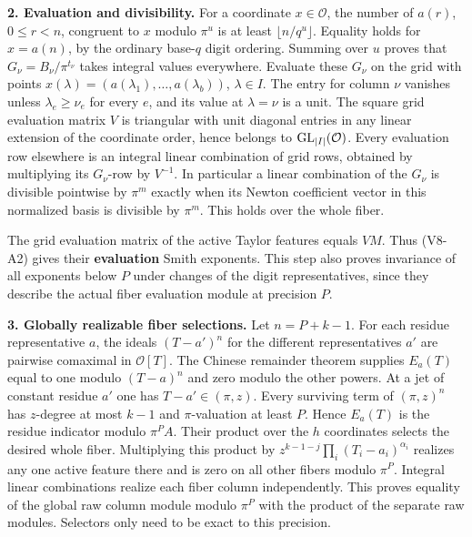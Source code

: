\documentclass[11pt,a4paper]{article}
\begin{document}
\textbf{2. Evaluation and divisibility.} For a coordinate
\(x\in\mathcal O\), the number of \(a(r)\), \(0\le r<n\), congruent to
\(x\) modulo \(\pi^u\) is at least \(\lfloor n/q^u\rfloor\). Equality
holds for \(x=a(n)\), by the ordinary base-\(q\) digit ordering. Summing
over \(u\) proves that \(G_\nu=B_\nu/\pi^{t_\nu}\) takes integral values
everywhere. Evaluate these \(G_\nu\) on the grid with points
\(x(\lambda)=(a(\lambda_1),\ldots,a(\lambda_b))\), \(\lambda\in I\). The
entry for column \(\nu\) vanishes unless \(\lambda_e\ge\nu_e\) for every
\(e\), and its value at \(\lambda=\nu\) is a unit. The square grid
evaluation matrix \(V\) is triangular with unit diagonal entries in any
linear extension of the coordinate order, hence belongs to
\({\rm GL}_{|I|}(\mathcal O)\). Every evaluation row elsewhere is an
integral linear combination of grid rows, obtained by multiplying its
\(G_\nu\)-row by \(V^{-1}\). In particular a linear combination of the
\(G_\nu\) is divisible pointwise by \(\pi^m\) exactly when its Newton
coefficient vector in this normalized basis is divisible by \(\pi^m\).
This holds over the whole fiber.

The grid evaluation matrix of the active Taylor features equals \(VM\).
Thus (V8-A2) gives their \textbf{evaluation} Smith exponents. This step
also proves invariance of all exponents below \(P\) under changes of the
digit representatives, since they describe the actual fiber evaluation
module at precision \(P\).

\textbf{3. Globally realizable fiber selections.} Let \(n=P+k-1\). For
each residue representative \(a\), the ideals \((T-a')^n\) for the
different representatives \(a'\) are pairwise comaximal in
\(\mathcal O[T]\). The Chinese remainder theorem supplies \(E_a(T)\)
equal to one modulo \((T-a)^n\) and zero modulo the other powers. At a
jet of constant residue \(a'\) one has \(T-a'\in(\pi,z)\). Every
surviving term of \((\pi,z)^n\) has \(z\)-degree at most \(k-1\) and
\(\pi\)-valuation at least \(P\). Hence \(E_a(T)\) is the residue
indicator modulo \(\pi^P A\). Their product over the \(h\) coordinates
selects the desired whole fiber. Multiplying this product by
\(z^{k-1-j}\prod_i(T_i-a_i)^{\alpha_i}\) realizes any one active feature
there and is zero on all other fibers modulo \(\pi^P\). Integral linear
combinations realize each fiber column independently. This proves
equality of the global raw column module modulo \(\pi^P\) with the
product of the separate raw modules. Selectors only need to be exact to
this precision.
\end{document}
